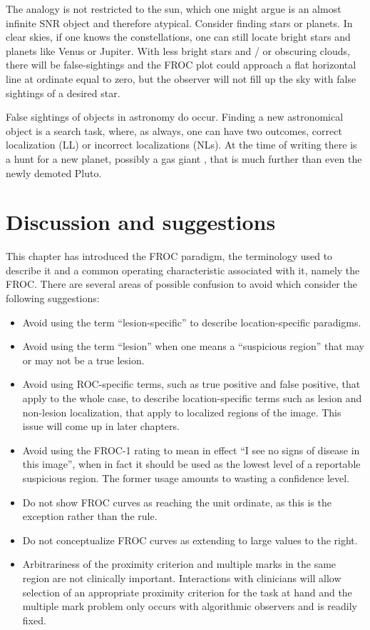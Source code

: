 \documentclass[
]{book}
\providecommand{\tightlist}{%
  \setlength{\itemsep}{0pt}\setlength{\parskip}{0pt}}
\begin{document}
The analogy is not restricted to the sun, which one might argue is an almost infinite SNR object and therefore atypical. Consider finding stars or planets. In clear skies, if one knows the constellations, one can still locate bright stars and planets like Venus or Jupiter. With less bright stars and / or obscuring clouds, there will be false-sightings and the FROC plot could approach a flat horizontal line at ordinate equal to zero, but the observer will not fill up the sky with false sightings of a desired star.

False sightings of objects in astronomy do occur. Finding a new astronomical object is a search task, where, as always, one can have two outcomes, correct localization (LL) or incorrect localizations (NLs). At the time of writing there is a hunt for a new planet, possibly a gas giant , that is much further than even the newly demoted Pluto.

\hypertarget{froc-paradigm-discussion}{%
\section{Discussion and suggestions}\label{froc-paradigm-discussion}}

This chapter has introduced the FROC paradigm, the terminology used to describe it and a common operating characteristic associated with it, namely the FROC. There are several areas of possible confusion to avoid which consider the following suggestions:

\begin{itemize}
\tightlist
\item
  Avoid using the term ``lesion-specific'' to describe location-specific paradigms.
\item
  Avoid using the term ``lesion'' when one means a ``suspicious region'' that may or may not be a true lesion.
\item
  Avoid using ROC-specific terms, such as true positive and false positive, that apply to the whole case, to describe location-specific terms such as lesion and non-lesion localization, that apply to localized regions of the image. This issue will come up in later chapters.
\item
  Avoid using the FROC-1 rating to mean in effect ``I see no signs of disease in this image'', when in fact it should be used as the lowest level of a reportable suspicious region. The former usage amounts to wasting a confidence level.
\item
  Do not show FROC curves as reaching the unit ordinate, as this is the exception rather than the rule.
\item
  Do not conceptualize FROC curves as extending to large values to the right.
\item
  Arbitrariness of the proximity criterion and multiple marks in the same region are not clinically important. Interactions with clinicians will allow selection of an appropriate proximity criterion for the task at hand and the multiple mark problem only occurs with algorithmic observers and is readily fixed.
\end{itemize}
\end{document}
